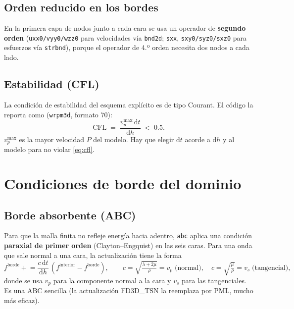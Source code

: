 \documentclass[11pt,a4paper]{article}
\newcommand{\dd}{\mathrm{d}}
\begin{document}
\subsection{Orden reducido en los bordes}
En la primera capa de nodos junto a cada cara se usa un operador de
\textbf{segundo orden} (\texttt{uxx0/vyy0/wzz0} para velocidades vía
\texttt{bnd2d}; \texttt{sxx}, \texttt{sxy0/syz0/sxz0} para esfuerzos vía
\texttt{strbnd}), porque el operador de 4.º orden necesita dos nodos a cada lado.

\subsection{Estabilidad (CFL)}
La condición de estabilidad del esquema explícito es de tipo Courant. El código
la reporta como (\texttt{wrpm3d}, formato 70):
\begin{equation}
  \mathrm{CFL} \;=\; \frac{v_p^{\max}\,\dd t}{\dd h} \;<\; 0.5 .
  \label{eq:cfl}
\end{equation}
$v_p^{\max}$ es la mayor velocidad $P$ del modelo. Hay que elegir $\dd t$ acorde
a $\dd h$ y al modelo para no violar \eqref{eq:cfl}.

\section{Condiciones de borde del dominio}

\subsection{Borde absorbente (ABC)}
Para que la malla finita no refleje energía hacia adentro, \texttt{abc} aplica
una condición \textbf{paraxial de primer orden} (Clayton--Engquist) en las seis
caras. Para una onda que sale normal a una cara, la actualización tiene la forma
\begin{equation}
  f^{\text{borde}} \mathrel{+}= \frac{c\,\dd t}{\dd h}\,(f^{\text{interior}}-f^{\text{borde}}),
  \qquad
  c=\sqrt{\tfrac{\lambda+2\mu}{\rho}}=v_p \;\text{(normal)},\quad
  c=\sqrt{\tfrac{\mu}{\rho}}=v_s \;\text{(tangencial)},
\end{equation}
donde se usa $v_p$ para la componente normal a la cara y $v_s$ para las
tangenciales. Es una ABC sencilla (la actualización FD3D\_TSN la reemplaza por
PML, mucho más eficaz).
\end{document}
